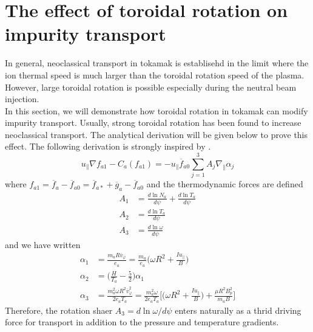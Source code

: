 \chapter{The effect of toroidal rotation on impurity transport}
\minitoc
In general, neoclassical transport in tokamak is establisehd in the limit where the ion thermal speed is much larger than the toroidal rotation speed of the plasma. However, large toroidal rotation is possible especially during the neutral beam injection. \\
In this section, we will demonstrate how toroidal rotation in tokamak can modify impurity transport. Usually, strong toroidal rotation has been found to increase neoclassical transport. The analytical derivation will be given below to prove this effect. The following derivation is strongly inspired by \citep{Hinton85, Helander07, Catto87}.
\begin{equation}
    u_\parallel \nabla f_{a1} - C_a(f_{a1}) = -u_\parallel \overbar{f}_{a0}\sum_{j=1}^3 A_j \nabla_\parallel \alpha_j
\end{equation}
where $f_{a1}=\overbar{f}_a-\overbar{f}_{a0}=\overbar{f}_{a*}+\overbar{g}_a-\overbar{f}_{a0}$ and the thermodynamic forces are defined
\begin{align}
    A_1 &= \frac{d\ln{N_a}}{d\psi} + \frac{d\ln{T_a}}{d\psi} \\
    A_2 &= \frac{d\ln{T_a}}{d\psi} \\
    A_3 &= \frac{d\ln{\omega}}{d\psi}
\end{align}
and we have written
\begin{align}
    \alpha_1 &=\frac{m_a R \overbar{v}_\varphi}{e_a} = \frac{m_a}{e_a}\Big(\omega R^2 + \frac{I u_\parallel}{B}\Big) \\
    \alpha_2 &= \big (\frac{H}{T_a}-\frac{5}{2}\Big)\alpha_1 \\
    \alpha_3 &= \frac{m_a^2 \omega R^2 \overbar{v}_\varphi^2}{2e_aT_a} = \frac{m_a^2 \omega}{2 e_a T_a}\Bigg[\Big(\omega R^2 + \frac{I u_\parallel}{B}\Big) + \frac{\mu R^2 B_p^2}{m_a B}\Bigg]
\end{align}
Therefore, the rotation shaer $A_3=d\ln{\omega}/d\psi$ enters naturally as a thrid driving force for transport in addition to the pressure and temperature gradients.

